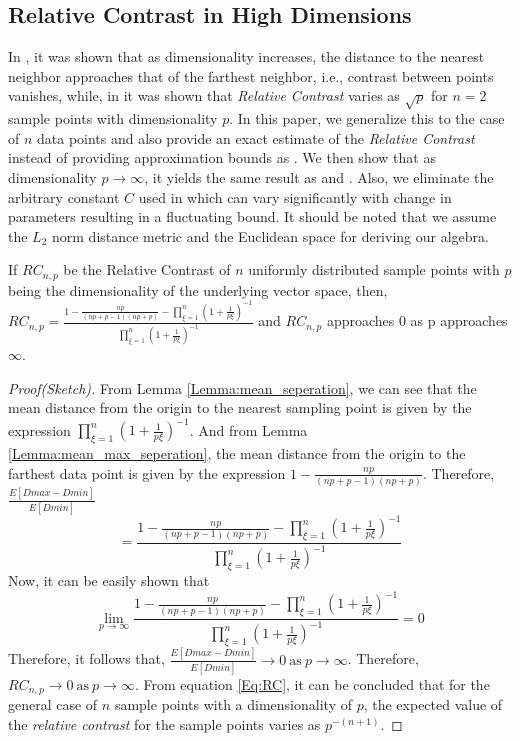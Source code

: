 \documentclass[11pt,a4paper]{article}
\begin{document}
\subsection{Relative Contrast in High Dimensions}\label{Sec:relative_contrast}

In \cite{Beyer1999}, it was shown that as dimensionality increases, the distance to the nearest neighbor approaches that of the farthest neighbor, i.e., contrast between points vanishes, while, in \cite{Aggarwal01} it was shown that \emph{Relative Contrast} varies as $\sqrt{p}$ for $n=2$ sample points with dimensionality $p$. In this paper, we generalize this to the case of $n$ data points and also provide an exact estimate of the \emph{Relative Contrast} instead of providing approximation bounds as \cite{Aggarwal01}. We then show that as dimensionality $p \to \infty$, it yields the same result as \cite{Beyer1999} and \cite{Aggarwal01}. Also, we eliminate the arbitrary constant $C$ used in \cite{Aggarwal01} which can vary significantly with change in parameters resulting in a fluctuating bound. It should be noted that we assume the $L_2$ norm distance metric and the Euclidean space for deriving our algebra.

\begin{theorem}\label{Theorem:RC}
If ${RC}_{n,p}$ be the Relative Contrast of $n$ uniformly distributed sample points with $p$ being the dimensionality of the underlying vector space, then,
${RC}_{n,p} = \frac{1-\frac{np}{(np+p-1)(np+p)}-\prod_{\xi=1}^n (1 + \frac{1}{p\xi})^{-1}}{\prod_{\xi=1}^n (1 + \frac{1}{p\xi})^{-1}}$ and ${RC}_{n,p}$  approaches 0 as p approaches $\infty$.
\end{theorem}      
\begin{proof}[Proof(Sketch)] From Lemma \ref{Lemma:mean_seperation}, we can see that the mean distance from the origin to the nearest sampling point is given by the expression $\prod_{\xi=1}^n (1 + \frac{1}{p\xi})^{-1}$.
And from Lemma \ref{Lemma:mean_max_seperation}, the mean distance from the origin to the farthest data point is given by the expression $1 - \frac{np}{(np+p-1)(np+p)}$.
Therefore, $\frac{E[Dmax-Dmin]}{E[Dmin]}$
\begin{equation}\label{Eq:RC}
= \frac{1-\frac{np}{(np+p-1)(np+p)}-\prod_{\xi=1}^n (1 + \frac{1}{p\xi})^{-1}}{\prod_{\xi=1}^n (1 + \frac{1}{p\xi})^{-1}}
\end{equation}
Now, it can be easily shown that
\begin{equation}
\lim_{p \to \infty} \frac{1-\frac{np}{(np+p-1)(np+p)}-\prod_{\xi=1}^n (1 + \frac{1}{p\xi})^{-1}}{\prod_{\xi=1}^n (1 + \frac{1}{p\xi})^{-1}} = 0
\end{equation}
Therefore, it follows that, $\frac{E[Dmax-Dmin]}{E[Dmin]} \to 0 ~\text{as}~ p \to \infty$.
Therefore, ${RC}_{n,p} \to 0 ~\text{as}~ p \to \infty $.
From equation \ref{Eq:RC}, it can be concluded that for the general case of $n$ sample points with a dimensionality of $p$, the expected value of the \emph{relative contrast} for the sample points varies as $p^{-(n+1)}$.
\end{proof}
\end{document}
